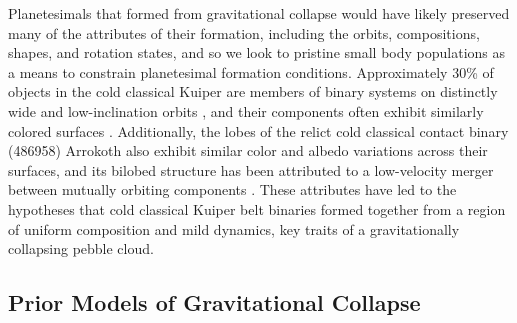 \documentclass[fleqn,usenatbib]{mnras}
\begin{document}
Planetesimals that formed from gravitational collapse would have likely preserved many of the attributes of their formation, including the orbits, compositions, shapes, and rotation states, and so we look to pristine small body populations as a means to constrain planetesimal formation conditions.
Approximately 30\% of objects in the cold classical Kuiper are members of binary systems \citep{Noll2020} on distinctly wide and low-inclination orbits \citep{Grundy2019}, and their components often exhibit similarly colored surfaces \citep{Fraser2021}.
Additionally, the lobes of the relict cold classical contact binary (486958) Arrokoth also exhibit similar color and albedo variations \citep{Stern2019,Grundy2020} across their surfaces, and its bilobed structure has been attributed to a low-velocity merger between mutually orbiting components \citep{Stern2019,McKinnon2020}.
These attributes have led to the hypotheses that cold classical Kuiper belt binaries formed together from a region of uniform composition and mild dynamics, key traits of a gravitationally collapsing pebble cloud.


\subsection{Prior Models of Gravitational Collapse}
\end{document}
